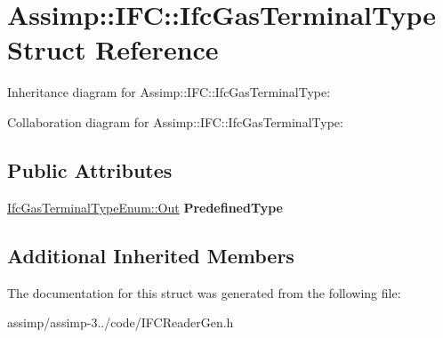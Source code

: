 \hypertarget{struct_assimp_1_1_i_f_c_1_1_ifc_gas_terminal_type}{\section{Assimp\+:\+:I\+F\+C\+:\+:Ifc\+Gas\+Terminal\+Type Struct Reference}
\label{struct_assimp_1_1_i_f_c_1_1_ifc_gas_terminal_type}
}


Inheritance diagram for Assimp\+:\+:I\+F\+C\+:\+:Ifc\+Gas\+Terminal\+Type\+:


Collaboration diagram for Assimp\+:\+:I\+F\+C\+:\+:Ifc\+Gas\+Terminal\+Type\+:
\subsection*{Public Attributes}
\begin{DoxyCompactItemize}
\item 
\hypertarget{struct_assimp_1_1_i_f_c_1_1_ifc_gas_terminal_type_aaf52b5c657a463864cded9b5d946a4da}{\hyperlink{classboost_1_1shared__ptr}{Ifc\+Gas\+Terminal\+Type\+Enum\+::\+Out} {\bfseries Predefined\+Type}}\label{struct_assimp_1_1_i_f_c_1_1_ifc_gas_terminal_type_aaf52b5c657a463864cded9b5d946a4da}

\end{DoxyCompactItemize}
\subsection*{Additional Inherited Members}


The documentation for this struct was generated from the following file\+:\begin{DoxyCompactItemize}
\item 
assimp/assimp-\/3../code/I\+F\+C\+Reader\+Gen.\+h\end{DoxyCompactItemize}
